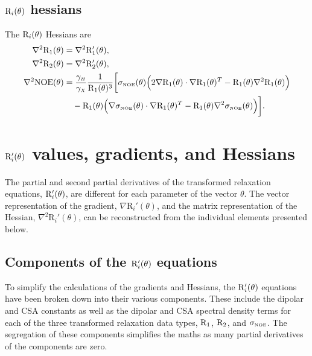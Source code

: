 \subsection{$\mathrm{R}_i(\theta)$ hessians}

The $\mathrm{R}_i(\theta)$ Hessians are
\begin{align}
    \nabla^2 \mathrm{R}_1(\theta) & = \nabla^2 \mathrm{R}_1'(\theta), \label{eq: Ri trans: d2R1} \\
    \nabla^2 \mathrm{R}_2(\theta) & = \nabla^2 \mathrm{R}_2'(\theta), \label{eq: Ri trans: d2R2} \\
    \nabla^2 \mathrm{NOE}(\theta) & = \frac{\gamma_{\scriptscriptstyle H}}{\gamma_{\scriptscriptstyle X}} \frac{1}{\mathrm{R}_1(\theta)^3} \bigg[
        \sigma_{\scriptscriptstyle \mathrm{NOE}}(\theta) \Big( 2 \nabla \mathrm{R}_1(\theta) \cdot \nabla \mathrm{R}_1(\theta)^T - \mathrm{R}_1(\theta) \nabla^2 \mathrm{R}_1(\theta) \Big) \nonumber\\
        & \quad - \mathrm{R}_1(\theta) \Big( \nabla \sigma_{\scriptscriptstyle \mathrm{NOE}}(\theta) \cdot \nabla \mathrm{R}_1(\theta)^T - \mathrm{R}_1(\theta) \nabla^2 \sigma_{\scriptscriptstyle \mathrm{NOE}}(\theta) \Big)
    \bigg]. \label{eq: Ri trans: d2NOE}
\end{align}




\section{$\mathrm{R}_i'(\theta)$ values, gradients, and Hessians}

The partial and second partial derivatives of the transformed relaxation equations, $\mathrm{R}_i'(\theta)$, are different for each parameter of the vector $\theta$.  The vector representation of the gradient, $\nabla \textrm{R}_i'(\theta)$, and the matrix representation of the Hessian, $\nabla^2 \textrm{R}_i'(\theta)$, can be reconstructed from the individual elements presented below.



\subsection{Components of the $\mathrm{R}_i'(\theta)$ equations}

To simplify the calculations of the gradients and Hessians, the $\mathrm{R}_i'(\theta)$ equations have been broken down into their various components.  These include the dipolar and CSA constants as well as the dipolar and CSA spectral density terms for each of the three transformed relaxation data types, $\mathrm{R}_1$, $\mathrm{R}_2$, and $\sigma_{\scriptscriptstyle \mathrm{NOE}}$.  The segregation of these components simplifies the maths as many partial derivatives of the components are zero.


